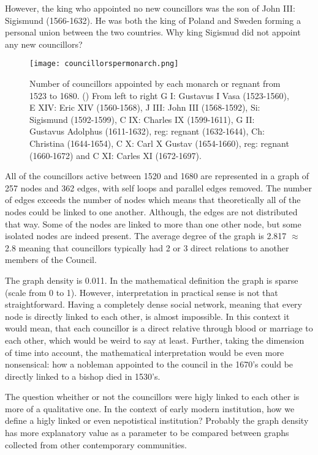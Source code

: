 However, the king who appointed no new councillors was the son of John III: Sigismund (1566-1632). He was both the king of Poland and Sweden forming a personal union between the two countries. Why king Sigismud did not appoint any new councillors? 

\begin{figure}
	\texttt{[image: councillorspermonarch.png]}
	\centering
	\caption[Number of councillors appointed by each ruler between 1523-1680] {Number of councillors appointed by each monarch or regnant from 1523 to 1680. (\cite{councillorsDS}) From left to right G I: Gustavus I Vasa (1523-1560), E XIV: Eric XIV (1560-1568), J III: John III (1568-1592), Si: Sigismund (1592-1599), C IX: Charles IX (1599-1611), G II: Gustavus Adolphus (1611-1632), reg: regnant (1632-1644), Ch: Christina (1644-1654), C X: Carl X Gustav (1654-1660), reg: regnant (1660-1672) and C XI: Carles XI (1672-1697).}
	\centering
\end{figure}

All of the councillors active between 1520 and 1680 are represented in a graph of 257 nodes and 362 edges, with self loops and parallel edges removed. The number of edges exceeds the number of nodes which means that theoretically all of the nodes could be linked to one another. Although, the edges are not distributed that way. Some of the nodes are linked to more than one other node, but some isolated nodes are indeed present. The average degree of the graph is 2.817 $\approx$ 2.8 meaning that councillors typically had 2 or 3 direct relations to another members of the Council.

The graph density is 0.011. In the mathematical definition the graph is sparse (scale from 0 to 1). However, interpretation in practical sense is not that straightforward. Having a completely dense social network, meaning that every node is directly linked to each other, is almost impossible. In this context it would mean, that each councillor is a direct relative through blood or marriage to each other, which would be weird to say at least. Further, taking the dimension of time into account, the mathematical interpretation would be even more nonsensical: how a nobleman appointed to the council in the 1670's could be directly linked to a bishop died in 1530's. 

The question wheither or not the councillors were higly linked to each other is more of a qualitative one. In the context of early modern institution, how we define a higly linked or even nepotistical institution? Probably the graph density has more explanatory value as a parameter to be compared between graphs collected from other contemporary communities.

